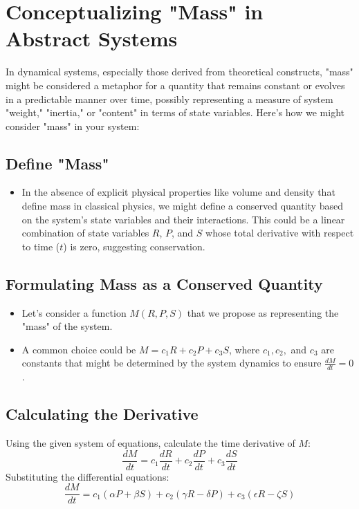\documentclass{article}
\begin{document}
\section*{Conceptualizing "Mass" in Abstract Systems}

In dynamical systems, especially those derived from theoretical constructs, "mass" might be considered a metaphor for a quantity that remains constant or evolves in a predictable manner over time, possibly representing a measure of system "weight," "inertia," or "content" in terms of state variables. Here's how we might consider "mass" in your system:

\subsection*{Define "Mass"}
\begin{itemize}
  \item In the absence of explicit physical properties like volume and density that define mass in classical physics, we might define a conserved quantity based on the system's state variables and their interactions. This could be a linear combination of state variables \( R \), \( P \), and \( S \) whose total derivative with respect to time (\( t \)) is zero, suggesting conservation.
\end{itemize}

\subsection*{Formulating Mass as a Conserved Quantity}
\begin{itemize}
  \item Let's consider a function \( M(R, P, S) \) that we propose as representing the "mass" of the system.
  \item A common choice could be \( M = c_1 R + c_2 P + c_3 S \), where \( c_1, c_2, \) and \( c_3 \) are constants that might be determined by the system dynamics to ensure \( \frac{dM}{dt} = 0 \).
\end{itemize}

\subsection*{Calculating the Derivative}
Using the given system of equations, calculate the time derivative of \( M \):
\[
\frac{dM}{dt} = c_1 \frac{dR}{dt} + c_2 \frac{dP}{dt} + c_3 \frac{dS}{dt}
\]
Substituting the differential equations:
\[
\frac{dM}{dt} = c_1 (\alpha P + \beta S) + c_2 (\gamma R - \delta P) + c_3 (\epsilon R - \zeta S)
\]
\end{document}
